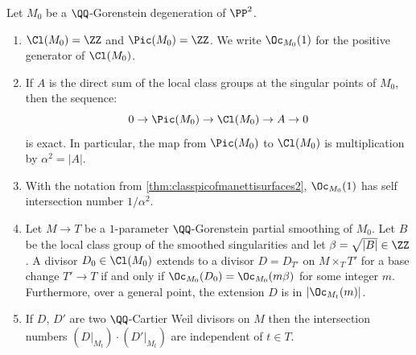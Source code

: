 \begin{theorem}\label{thm:classpicofmanettisurfaces} Let $M_0$ be a $\QQ$-Gorenstein degeneration of $\PP^2$.
\begin{enumerate}
\item\label{thm:classpicofmanettisurfaces1}
$\Cl(M_0)=\ZZ$ and $\Pic(M_0)=\ZZ$. We write $\Oc_{M_0}(1)$ for the positive generator of $\Cl(M_0)$.
\item\label{thm:classpicofmanettisurfaces2}
If $A$ is the direct sum of the local class groups at the singular points of $M_0$, then the sequence:
\[
0\to \Pic(M_0)\to \Cl(M_0)\to A\to 0
\]
is exact. In particular, the map from $\Pic(M_0)$ to $\Cl(M_0)$ is multiplication by $\alpha^2=|A|$.
\item\label{thm:classpicofmanettisurfaces3}
With the notation from \eqref{thm:classpicofmanettisurfaces2}, $\Oc_{M_0}(1)$ has self intersection number $1/\alpha^2$.
\item\label{thm:classpicofmanettisurfaces4}
Let $M \to T$ be a $1$-parameter $\QQ$-Gorenstein partial smoothing of $M_0$. Let $B$ be the local class group of the smoothed singularities and let $\beta=\sqrt{|B|}\in \ZZ$. A divisor $D_0\in \Cl(M_0)$ extends to a divisor $D = D_{T'}$ on $M \times_T T'$ for a base change $T' \to T$ if and only if $\Oc_{M_0}(D_0) = \Oc_{M_0}(m \beta)$ for some integer $m$. Furthermore, over a general point, the extension $D$ is in $|\Oc_{M_t}(m)|$.
\item\label{thm:classpicofmanettisurfaces5}
If $D$, $D'$ are two $\QQ$-Cartier Weil divisors on $M$ then the intersection numbers $(D|_{M_t})\cdot (D'|_{M_t})$ are independent of $t\in T$.
\end{enumerate}
\end{theorem}

